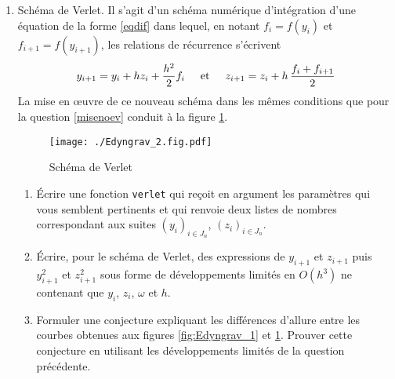 \begin{enumerate}
\item Schéma de Verlet. Il s'agit d'un schéma numérique d'intégration d'une équation de la forme \ref{eqdif} dans lequel, en notant $f_i=f(y_i)$ et $f_{i+1}=f(y_{i+1})$, les relations de récurrence s'écrivent
\begin{displaymath}
  y_{i+1} = y_{i} + hz_i + \frac{h^2}{2} f_i\hspace{0.5cm}\text{et}\hspace{0.5cm} z_{i+1} = z_i + h\,\frac{f_i + f_{i+1}}{2}
\end{displaymath}
La mise en \oe{}uvre de ce nouveau schéma dans les mêmes conditions que pour la question \ref{misenoev} conduit à la figure \ref{fig:Edyngrav_2}.
\begin{figure}[h]
  \centering
  \texttt{[image: ./Edyngrav\_2.fig.pdf]}
  \caption{Schéma de Verlet}
  \label{fig:Edyngrav_2}
\end{figure}
\begin{enumerate}
  \item \'Ecrire une fonction \texttt{verlet} qui reçoit en argument les paramètres qui vous semblent pertinents et qui renvoie deux listes de nombres correspondant aux suites $\left(y_i \right)_{i\in J_n}$, $\left(z_i \right)_{i\in J_n}$.
  \item \'Ecrire, pour le schéma de Verlet, des expressions de $y_{i+1}$ et $z_{i+1}$ puis $y_{i+1}^2$ et $z_{i+1}^2$ sous forme de développements limités en $O(h^3)$ ne contenant que $y_i$, $z_i$, $\omega$ et $h$.
  \item Formuler une conjecture expliquant les différences d'allure entre les courbes obtenues aux figures \ref{fig:Edyngrav_1} et \ref{fig:Edyngrav_2}. Prouver cette conjecture en utilisant les développements limités de la question précédente. 
\end{enumerate}
\end{enumerate}


